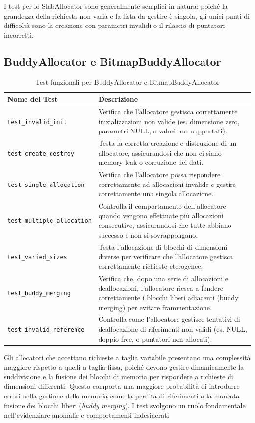 I test per lo SlabAllocator sono generalmente semplici in natura: poiché la grandezza della richiesta non varia e la lista da gestire è singola, gli unici punti di difficoltà sono la creazione con parametri invalidi o il rilascio di puntatori incorretti.


\subsection{BuddyAllocator e BitmapBuddyAllocator}
\begin{table}[H]
\centering
\begin{tabularx}{\textwidth}{|l|X|}
\hline
\textbf{Nome del Test} & \textbf{Descrizione} \\
\hline
\texttt{test\_invalid\_init} & Verifica che l'allocatore gestisca correttamente inizializzazioni non valide (es. dimensione zero, parametri NULL, o valori non supportati). \\
\hline
\texttt{test\_create\_destroy} & Testa la corretta creazione e distruzione di un allocatore, assicurandosi che non ci siano memory leak o corruzione dei dati. \\
\hline
\texttt{test\_single\_allocation} & Verifica che l'allocatore possa rispondere correttamente ad allocazioni invalide e gestire correttamente una singola allocazione. \\
\hline
\texttt{test\_multiple\_allocation} & Controlla il comportamento dell'allocatore quando vengono effettuate più allocazioni consecutive, assicurandosi che tutte abbiano successo e non si sovrappongano. \\
\hline
\texttt{test\_varied\_sizes} & Testa l'allocazione di blocchi di dimensioni diverse per verificare che l'allocatore gestisca correttamente richieste eterogenee. \\
\hline
\texttt{test\_buddy\_merging} & Verifica che, dopo una serie di allocazioni e deallocazioni, l'allocatore riesca a fondere correttamente i blocchi liberi adiacenti (buddy merging) per evitare frammentazione. \\
\hline
\texttt{test\_invalid\_reference} & Controlla come l'allocatore gestisce tentativi di deallocazione di riferimenti non validi (es. NULL, doppio free, o puntatori non allocati). \\
\hline
\end{tabularx}
\caption{Test funzionali per BuddyAllocator e BitmapBuddyAllocator}
\end{table}

Gli allocatori che accettano richieste a taglia variabile presentano una complessità maggiore rispetto a quelli a taglia fissa, poiché devono gestire dinamicamente la suddivisione e la fusione dei blocchi di memoria per rispondere a richieste di dimensioni differenti. Questo comporta una maggiore probabilità di introdurre errori nella gestione della memoria come la perdita di riferimenti o la mancata fusione dei blocchi liberi (\textit{buddy merging}). I test svolgono un ruolo fondamentale nell'evidenziare anomalie e comportamenti indesiderati


